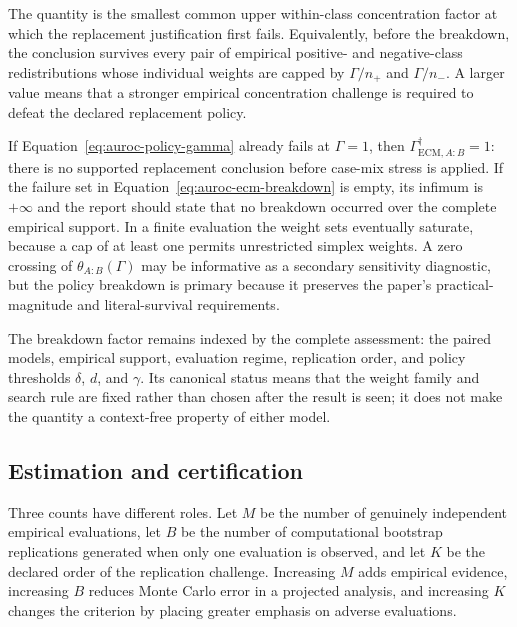 \documentclass[11pt]{article}
\theoremstyle{remark}
\begin{document}
The quantity is the smallest common upper within-class concentration factor at
which the replacement justification first fails. Equivalently, before the
breakdown, the conclusion survives every pair of empirical positive- and
negative-class redistributions whose individual weights are capped by
$\Gamma/n_+$ and $\Gamma/n_-$. A larger value means that a stronger empirical
concentration challenge is required to defeat the declared replacement policy.

If Equation~\eqref{eq:auroc-policy-gamma} already fails at $\Gamma=1$, then
$\Gamma_{\mathrm{ECM},A:B}^{\dagger}=1$: there is no supported replacement
conclusion before case-mix stress is applied. If the failure set in
Equation~\eqref{eq:auroc-ecm-breakdown} is empty, its infimum is $+\infty$ and
the report should state that no breakdown occurred over the complete empirical
support. In a finite evaluation the weight sets eventually saturate, because a
cap of at least one permits unrestricted simplex weights. A zero crossing of
$\theta_{A:B}(\Gamma)$ may be informative as a secondary sensitivity
diagnostic, but the policy breakdown is primary because it preserves the
paper's practical-magnitude and literal-survival requirements.

The breakdown factor remains indexed by the complete assessment: the paired
models, empirical support, evaluation regime, replication order, and policy
thresholds $\delta$, $d$, and $\gamma$. Its canonical status means that the
weight family and search rule are fixed rather than chosen after the result is
seen; it does not make the quantity a context-free property of either model.

\subsection{Estimation and certification}

Three counts have different roles. Let $M$ be the number of genuinely
independent empirical evaluations, let $B$ be the number of computational
bootstrap replications generated when only one evaluation is observed, and let
$K$ be the declared order of the replication challenge. Increasing $M$ adds
empirical evidence, increasing $B$ reduces Monte Carlo error in a projected
analysis, and increasing $K$ changes the criterion by placing greater emphasis
on adverse evaluations.
\end{document}
